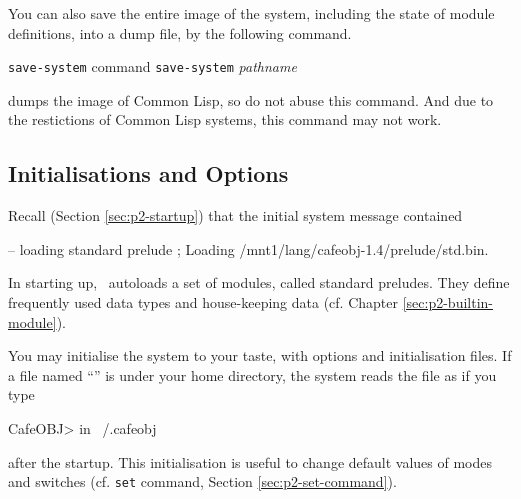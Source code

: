\documentclass[a4paper]{memoir}
\begin{document}
You can also save the entire image of the system, including
the state of module definitions, into a dump file, by the following
command.

\begin{bsyntax} \texttt{save-system} command \Hline
\texttt{save-system} \textit{pathname}
\end{bsyntax}

\begin{warning}
   dumps the image of Common Lisp, so do not abuse
  this command.
  And due to the restictions of Common Lisp systems, this command may
  not work.
\end{warning}

\subsection{Initialisations and Options}\label{sec:p2-init-opt}

Recall (Section \ref{sec:p2-startup}) that the initial system message
contained
\begin{vvtm}
\begin{ccode}
  -- loading standard prelude 
  ; Loading /mnt1/lang/cafeobj-1.4/prelude/std.bin.
\end{ccode}
\end{vvtm}
In starting up, \cafeobj~autoloads a set of modules,
called standard preludes. They
define frequently used data types
and house-keeping data (cf. Chapter \ref{sec:p2-builtin-module}).

You may initialise the system to your taste, with options and
initialisation files.
If a file named ``'' is under your
home directory, the system reads the file as if you type
\begin{vvtm}
\begin{ccode}
  CafeOBJ> in ~/.cafeobj
\end{ccode}
\end{vvtm}
after the startup. This initialisation is useful to change default
values of modes and switches (cf. \verb|set| command, Section
\ref{sec:p2-set-command}).
\end{document}

